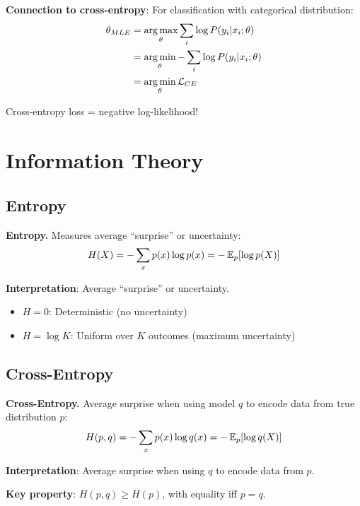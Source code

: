 \textbf{Connection to cross-entropy}:
For classification with categorical distribution:
\begin{align}
\theta_{MLE} &= \operatorname*{arg\,max}_\theta \sum_i \log P(y_i|x_i; \theta) \\
&= \operatorname*{arg\,min}_\theta -\sum_i \log P(y_i|x_i; \theta) \\
&= \operatorname*{arg\,min}_\theta \mathcal{L}_{CE}
\end{align}

Cross-entropy loss = negative log-likelihood!

\section{Information Theory}
\label{sec:information_theory}

\subsection{Entropy}

\textbf{Entropy.} Measures average ``surprise'' or uncertainty:
\begin{equation}
H(X) = -\sum_x p(x) \log p(x) = -\operatorname{\mathbb{E}}_p[\log p(X)]
\end{equation}

\textbf{Interpretation}: Average ``surprise'' or uncertainty.
\begin{itemize}
    \item $H = 0$: Deterministic (no uncertainty)
    \item $H = \log K$: Uniform over $K$ outcomes (maximum uncertainty)
\end{itemize}

\subsection{Cross-Entropy}

\textbf{Cross-Entropy.} Average surprise when using model $q$ to encode data from true distribution $p$:
\begin{equation}
H(p, q) = -\sum_x p(x) \log q(x) = -\operatorname{\mathbb{E}}_p[\log q(X)]
\end{equation}

\textbf{Interpretation}: Average surprise when using $q$ to encode data from $p$.

\textbf{Key property}: $H(p, q) \geq H(p)$, with equality iff $p = q$.


